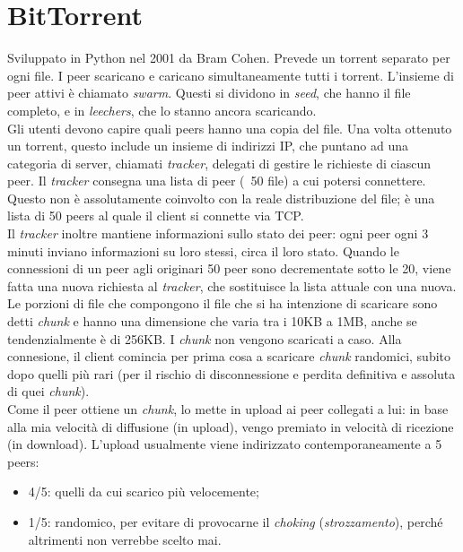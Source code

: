 \section{BitTorrent}
Sviluppato in Python nel 2001 da Bram Cohen.
Prevede un torrent separato per ogni file. I peer scaricano e caricano simultaneamente tutti i torrent. L'insieme di peer attivi è chiamato \textit{swarm}. Questi si dividono in \textit{seed}, che hanno il file completo, e in \textit{leechers}, che lo stanno ancora scaricando. \\
Gli utenti devono capire quali peers hanno una copia del file.
Una volta ottenuto un torrent, questo include un insieme di indirizzi IP, che puntano ad una categoria di server, chiamati \textit{tracker}, delegati di gestire le richieste di ciascun peer. Il \textit{tracker} consegna una lista di peer (~50 file) a cui potersi connettere. Questo non è assolutamente coinvolto con la reale distribuzione del file; è una lista di 50 peers al quale il client si connette via TCP. \\
Il \textit{tracker} inoltre mantiene informazioni sullo stato dei peer: ogni peer ogni 3 minuti inviano informazioni su loro stessi, circa il loro stato. Quando le connessioni di un peer agli originari 50 peer sono decrementate sotto le 20, viene fatta una nuova richiesta al \textit{tracker}, che sostituisce la lista attuale con una nuova. \\
Le porzioni di file che compongono il file che si ha intenzione di scaricare sono detti \textit{chunk} e hanno una dimensione che varia tra i 10KB a 1MB, anche se tendenzialmente è di 256KB. I \textit{chunk} non vengono scaricati a caso. Alla connesione, il client comincia per prima cosa a scaricare \textit{chunk} randomici, subito dopo quelli più rari (per il rischio di disconnessione e perdita definitiva e assoluta di quei \textit{chunk}). \\
Come il peer ottiene un \textit{chunk}, lo mette in upload ai peer collegati a lui: in base alla mia velocità di diffusione (in upload), vengo premiato in velocità di ricezione (in download).
L'upload usualmente viene indirizzato contemporaneamente a 5 peers:
\begin{itemize}
    \item 4/5: quelli da cui scarico più velocemente;
    \item 1/5: randomico, per evitare di provocarne il \textit{choking} (\textit{strozzamento}), perché altrimenti non verrebbe scelto mai.
\end{itemize}

